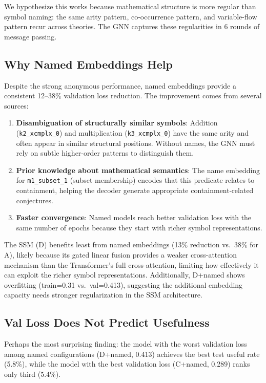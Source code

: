 \documentclass{article}
\begin{document}
We hypothesize this works because mathematical structure is more regular than
symbol naming: the same arity pattern, co-occurrence pattern, and variable-flow
pattern recur across theories. The GNN captures these regularities in 6 rounds
of message passing.

\subsection{Why Named Embeddings Help}

Despite the strong anonymous performance, named embeddings provide a
consistent 12--38\% validation loss reduction. The improvement comes from
several sources:
\begin{enumerate}
\item \textbf{Disambiguation of structurally similar symbols}: Addition
      (\texttt{k2\_xcmplx\_0}) and multiplication (\texttt{k3\_xcmplx\_0})
      have the same arity and often appear in similar structural positions.
      Without names, the GNN must rely on subtle higher-order patterns to
      distinguish them.
\item \textbf{Prior knowledge about mathematical semantics}: The name
      embedding for \texttt{m1\_subset\_1} (subset membership) encodes that
      this predicate relates to containment, helping the decoder generate
      appropriate containment-related conjectures.
\item \textbf{Faster convergence}: Named models reach better validation loss
      with the same number of epochs because they start with richer symbol
      representations.
\end{enumerate}

The SSM (D) benefits least from named embeddings (13\% reduction vs.\ 38\% for A),
likely because its gated linear fusion provides a weaker cross-attention mechanism
than the Transformer's full cross-attention, limiting how effectively it can exploit
the richer symbol representations. Additionally, D+named shows overfitting
(train=0.31 vs.\ val=0.413), suggesting the additional embedding capacity
needs stronger regularization in the SSM architecture.

\subsection{Val Loss Does Not Predict Usefulness}

Perhaps the most surprising finding: the model with the worst validation loss
among named configurations (D+named, 0.413) achieves the best test useful rate
(5.8\%), while the model with the best validation loss (C+named, 0.289) ranks
only third (5.4\%).
\end{document}
